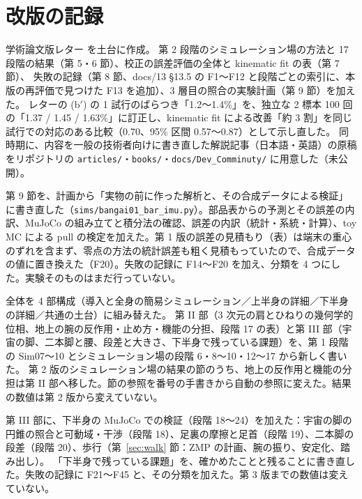 \documentclass[paper=a4paper,fontsize=10pt,twocolumn,column_gap=2zw,line_length=24zw,number_of_lines=46,head_space=20mm]{jlreq}
\begin{document}
\section{改版の記録}
\small
\begin{description}\setlength{\itemsep}{0pt}
\item[第 1 版（2026-11-26）] 学術論文版レター \cite{letter2026} を土台に作成。
第 2 段階のシミュレーション場の方法と 17 段階の結果（第 5・6 節）、校正の誤差評価の全体と kinematic fit の表（第 7 節）、
失敗の記録（第 8 節、docs/13 §13.5 の F1〜F12 と段階ごとの索引に、本版の再評価で見つけた F13 を追加）、3 層目の照合の実験計画（第 9 節）を加えた。
レターの (b$'$) の 1 試行のばらつき「1.2〜1.4\%」を、独立な 2 標本 100 回の「1.37 / 1.45 / 1.63\%」に訂正し、kinematic fit による改善「約 3 割」を同じ試行での対応のある比較（0.70、95\% 区間 0.57〜0.87）として示し直した。
同時期に、内容を一般の技術者向けに書き直した解説記事（日本語・英語）の原稿をリポジトリの \texttt{articles/}・\texttt{books/}・\texttt{docs/Dev\_Comminuty/} に用意した（未公開）。
\item[第 2 版（2026-11-26）] 第 9 節を、計画から「実物の前に作った解析と、その合成データによる検証」に書き直した（\texttt{sims/bangai01\_bar\_imu.py}）。部品表からの予測とその誤差の内訳、MuJoCo の組み立てと積分法の確認、誤差の内訳（統計・系統・計算）、toy MC による pull の検定を加えた。第 1 版の誤差の見積もり（表）は端末の重心のずれを含まず、零点の方法の統計誤差も粗く見積もっていたので、合成データの値に置き換えた（F20）。失敗の記録に F14〜F20 を加え、分類を 4 つにした。実験そのものはまだ行っていない。
\item[第 3 版（2026-11-26）] 全体を 4 部構成（導入と全身の簡易シミュレーション／上半身の詳細／下半身の詳細／共通の土台）に組み替えた。
第 II 部（3 次元の肩とひねりの幾何学的位相、地上の腕の反作用・止め方・機能の分担、段階 17 の表）と第 III 部（宇宙の脚、二本脚と腰、段差と大きさ、下半身で残っている課題）を、第 1 段階の Sim07〜10 とシミュレーション場の段階 6・8〜10・12〜17 から新しく書いた。
第 2 版のシミュレーション場の結果の節のうち、地上の反作用と機能の分担は第 II 部へ移した。節の参照を番号の手書きから自動の参照に変えた。結果の数値は第 2 版から変えていない。
\item[第 4 版（2026-11-27）] 第 III 部に、下半身の MuJoCo での検証（段階 18〜24）を加えた：宇宙の脚の円錐の照合と可動域・干渉（段階 18）、足裏の摩擦と足首（段階 19）、二本脚の段差（段階 20）、歩行（第~\ref{sec:walk} 節：ZMP の計画、腕の振り、安定化、踏み出し）。
「下半身で残っている課題」を、確かめたことと残ることに書き直した。失敗の記録に F21〜F45 と、その分類を加えた。第 3 版までの数値は変えていない。

\end{description}
\end{document}
